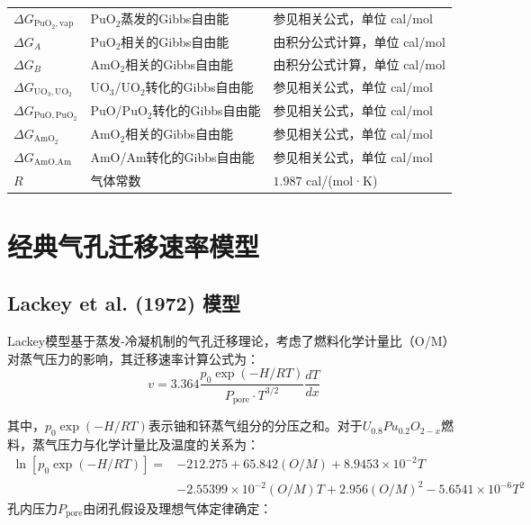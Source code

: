 \begin{xltabular}{\textwidth}{>{\centering\arraybackslash{}\hsize}X 
			>{\RaggedRight\arraybackslash{}\hsize}X 
			>{\centering\arraybackslash{}\hsize}X}
		$\Delta G_{\text{PuO}_2,\text{vap}}$ & PuO$_2$蒸发的Gibbs自由能 & 参见相关公式，单位 cal/mol \\
		$\Delta G_A$ & PuO$_2$相关的Gibbs自由能 & 由积分公式计算，单位 cal/mol \\
		$\Delta G_B$ & AmO$_2$相关的Gibbs自由能 & 由积分公式计算，单位 cal/mol \\
		$\Delta G_{\text{UO}_3,\text{UO}_2}$ & UO$_3$/UO$_2$转化的Gibbs自由能 & 参见相关公式，单位 cal/mol \\
		$\Delta G_{\text{PuO},\text{PuO}_2}$ & PuO/PuO$_2$转化的Gibbs自由能 & 参见相关公式，单位 cal/mol \\
		$\Delta G_{\text{AmO}_2}$ & AmO$_2$相关的Gibbs自由能 & 参见相关公式，单位 cal/mol \\
		$\Delta G_{\text{AmO},\text{Am}}$ & AmO/Am转化的Gibbs自由能 & 参见相关公式，单位 cal/mol \\
		$R$ & 气体常数 & $1.987$ cal/(mol·K) \\
	\end{xltabular}


\section{经典气孔迁移速率模型}

\subsection{Lackey et al. (1972) 模型}

Lackey模型基于蒸发-冷凝机制的气孔迁移理论，考虑了燃料化学计量比（O/M）对蒸气压力的影响，其迁移速率计算公式为：
\begin{equation}
v = 3.364 \frac{p_0 \exp(-H/RT)}{P_{\text{pore}} \cdot T^{3/2}} \frac{dT}{dx}
\label{eq:app_b_lackey_migration_velocity}
\end{equation}

其中，$p_0 \exp(-H/RT)$表示铀和钚蒸气组分的分压之和。对于$U_{0.8}Pu_{0.2}O_{2-x}$燃料，蒸气压力与化学计量比及温度的关系为：
\begin{equation}
\begin{split}
	\ln[p_0 \exp(-H/RT)] = & -212.275 + 65.842(O/M) + 8.9453 \times 10^{-2}T \\
	& - 2.55399 \times 10^{-2}(O/M)T + 2.956(O/M)^2 - 5.6541 \times 10^{-6}T^2
\end{split}
\label{eq:app_b_lackey_vapor_pressure_fit}
\end{equation}
孔内压力$P_{\text{pore}}$由闭孔假设及理想气体定律确定：


